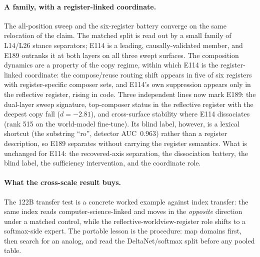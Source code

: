 \documentclass[10pt,a4paper,twocolumn]{article}
\begin{document}
\paragraph{A family, with a register-linked coordinate.}
The all-position sweep and the six-register battery converge on the same
relocation of the claim. The matched split is read out by a small family of
L14/L26 stance separators; E114 is a leading, causally-validated member, and
E189 outranks it at both layers on all three swept surfaces. The composition
dynamics are a property of the copy regime, within which E114 is the
register-linked coordinate: the compose/reuse routing shift appears in five
of six registers with register-specific composer sets, and E114's own
suppression appears only in the reflective register, rising in code. Three
independent lines now mark E189: the dual-layer sweep signature, top-composer
status in the reflective register with the deepest copy fall ($d{=}{-}2.81$),
and cross-surface stability where E114 dissociates (rank 515 on the
world-model fine-tune). Its blind label, however, is a lexical shortcut (the substring ``ro'', detector
AUC~$0.963$) rather than a register description, so E189 separates without
carrying the register semantics. What is
unchanged for E114: the recovered-axis separation, the dissociation battery,
the blind label, the sufficiency intervention, and the coordinate role.

\paragraph{What the cross-scale result buys.}
The 122B transfer test is a concrete worked example against index transfer: the
same index reads computer-science-linked and moves in the \emph{opposite}
direction under a matched control, while the reflective-worldview-register role shifts to a
softmax-side expert. The portable lesson is the procedure: map domains first, then search for an
analog, and read the DeltaNet/softmax split before any pooled table.
\end{document}
